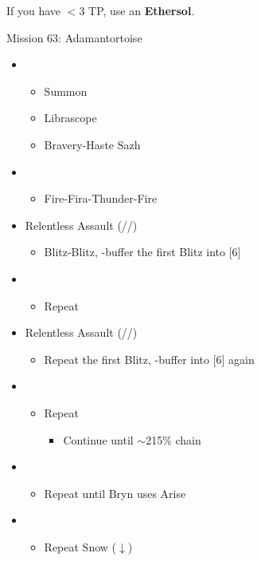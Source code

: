 \renewcommand{\third}{[3] Ruthless (\com/\rav/\sab)}
\renewcommand{\fifth}{[5] Relentless Assault (\com/\rav/\rav)}

If you have $<3$ TP, use an \textbf{Ethersol}.

\begin{battle}{Mission 63: Adamantortoise}
	\begin{itemize}
		\item \fourth
			\begin{itemize}
				\item Summon
				\item Librascope
				\item Bravery-Haste Sazh
			\end{itemize}
		\item \sixth
			\begin{itemize}
				\item Fire-Fira-Thunder-Fire
			\end{itemize}
		\item \fifth
			\begin{itemize}
				\item Blitz-Blitz, \rav-buffer the first Blitz into [6]
			\end{itemize}
		\item \sixth
			\begin{itemize}
				\item Repeat
			\end{itemize}
		\item \fifth
			\begin{itemize}
				\item Repeat the first Blitz, \rav-buffer into [6] again
			\end{itemize}
		\item \sixth
			\begin{itemize}
				\item Repeat
					\begin{itemize}
						\item Continue until $\sim$215\% chain
					\end{itemize}
			\end{itemize}
		\item \second
			\begin{itemize}
				\item Repeat until Bryn uses Arise
			\end{itemize}
		\item \fourth
			\begin{itemize}
				\item Repeat Snow ($\downarrow$)

\end{itemize}
\end{itemize}
\end{battle}
